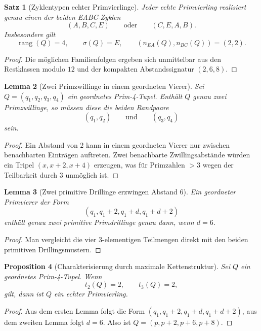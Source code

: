 \documentclass[12pt,a4paper]{article}
\newtheorem{satz}{Satz}[section]
\newtheorem{lemma}[satz]{Lemma}
\newtheorem{proposition}[satz]{Proposition}
\theoremstyle{definition}
\theoremstyle{remark}
\newcommand{\rang}{\operatorname{rang}}
\newcommand{\signatur}{\sigma}
\begin{document}
	\begin{satz}[Zyklentypen echter Primvierlinge]
		Jeder echte Primvierling realisiert genau einen der beiden EABC-Zyklen
		\[
		(A,B,C,E)
		\qquad\text{oder}\qquad
		(C,E,A,B).
		\]
		Insbesondere gilt
		\[
		\rang(Q)=4,
		\qquad
		\signatur(Q)=E,
		\qquad
		(n_{EA}(Q),n_{BC}(Q))=(2,2).
		\]
	\end{satz}
	
	\begin{proof}
		Die möglichen Familienfolgen ergeben sich unmittelbar aus den Restklassen modulo \(12\) und der kompakten Abstandssignatur \((2,6,8)\).
	\end{proof}
	
	\begin{lemma}[Zwei Primzwillinge in einem geordneten Vierer]
		Sei \(Q=(q_1,q_2,q_3,q_4)\) ein geordnetes Prim-4-Tupel. Enthält \(Q\) genau zwei Primzwillinge, so müssen diese die beiden Randpaare
		\[
		(q_1,q_2)\qquad\text{und}\qquad(q_3,q_4)
		\]
		sein.
	\end{lemma}
	
	\begin{proof}
		Ein Abstand von \(2\) kann in einem geordneten Vierer nur zwischen benachbarten Einträgen auftreten. Zwei benachbarte Zwillingsabstände würden ein Tripel \((x,x+2,x+4)\) erzeugen, was für Primzahlen \(>3\) wegen der Teilbarkeit durch \(3\) unmöglich ist.
	\end{proof}
	
	\begin{lemma}[Zwei primitive Drillinge erzwingen Abstand \(6\)]
		Ein geordneter Primvierer der Form
		\[
		(q_1,q_1+2,q_1+d,q_1+d+2)
		\]
		enthält genau zwei primitive Primdrillinge genau dann, wenn \(d=6\).
	\end{lemma}
	
	\begin{proof}
		Man vergleicht die vier 3-elementigen Teilmengen direkt mit den beiden primitiven Drillingsmustern.
	\end{proof}
	
	\begin{proposition}[Charakterisierung durch maximale Kettenstruktur]
		Sei \(Q\) ein geordnetes Prim-4-Tupel. Wenn
		\[
		t_2(Q)=2,\qquad t_3(Q)=2,
		\]
		gilt, dann ist \(Q\) ein echter Primvierling.
	\end{proposition}
	
	\begin{proof}
		Aus dem ersten Lemma folgt die Form \((q_1,q_1+2,q_1+d,q_1+d+2)\), aus dem zweiten Lemma folgt \(d=6\). Also ist \(Q=(p,p+2,p+6,p+8)\).
	\end{proof}
	
\end{document}
